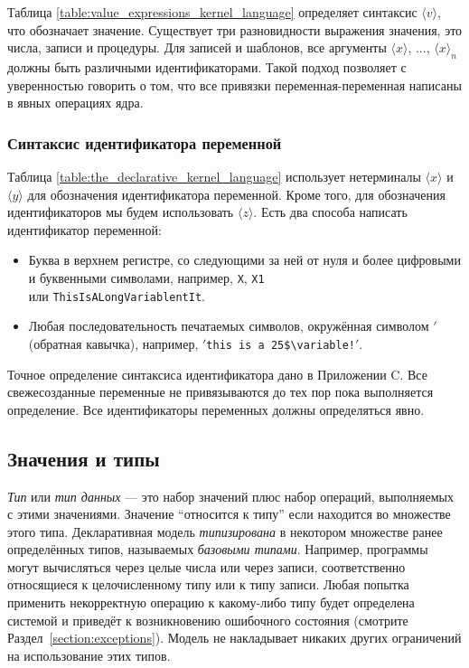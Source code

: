 Таблица \ref{table:value_expressions_kernel_language} определяет синтаксис $\langle v \rangle$, что обозначает значение. Существует три разновидности выражения значения, это числа, записи и процедуры. Для записей и шаблонов, все аргументы $\langle x \rangle$, ..., ${\langle x \rangle}_{n}$ должны быть различными идентификаторами. Такой подход позволяет с уверенностью говорить о том, что все привязки переменная-переменная написаны в явных операциях ядра.

\subsubsection{Синтаксис идентификатора переменной}

Таблица \ref{table:the_declarative_kernel_language} использует нетерминалы $\langle x \rangle$ и $\langle y \rangle$ для обозначения идентификатора переменной. Кроме того, для обозначения идентификаторов мы будем использовать $\langle z \rangle$. Есть два способа написать идентификатор переменной:

\begin{itemize}
\item{Буква в верхнем регистре, со следующими за ней от нуля и более цифровыми и буквенными символами, например, \lstinline|X|, \lstinline|X1| \\или \lstinline|ThisIsALongVariablentIt|.}

\item{Любая последовательность печатаемых символов, окружённая символом $'$ (обратная кавычка), например, $'$\verb|this is a 25$\variable!|$'$.}
\end{itemize}

Точное определение синтаксиса идентификатора дано в Приложении C. Все свежесозданные переменные не привязываются до тех пор пока выполняется определение. Все идентификаторы переменных должны определяться явно.

\subsection{Значения и типы}

\emph{Тип} или \emph{тип данных} --- это набор значений плюс набор операций, выполняемых с этими значениями. Значение ``относится к типу'' если находится во множестве этого типа. Декларативная модель \emph{типизирована} в некотором множестве ранее определённых типов, называемых \emph{базовыми типами}. Например, программы могут вычисляться через целые числа или через записи, соответственно относящиеся к целочисленному типу или к типу записи. Любая попытка применить некорректную операцию к какому-либо типу будет определена системой и приведёт к возникновению ошибочного состояния (смотрите Раздел~\ref{section:exceptions}). Модель не накладывает никаких других ограничений на использование этих типов.

